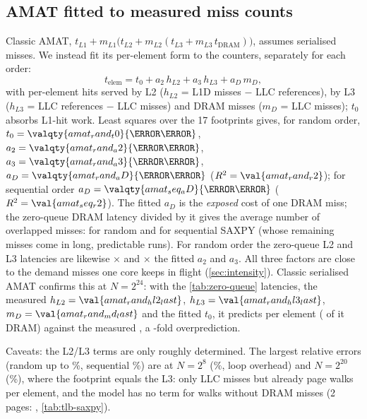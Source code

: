 \subsection{AMAT fitted to measured miss counts}
Classic AMAT, $t_{L1} + m_{L1}\bigl(t_{L2} + m_{L2}(t_{L3} + m_{L3}\,t_{\text{DRAM}})\bigr)$, assumes
serialised misses. We instead fit its per-element form to the counters, separately for each order:
\begin{equation}\label{eq:amat-fit}
  t_{\text{elem}} = t_0 + a_2\,h_{L2} + a_3\,h_{L3} + a_D\,m_D ,
\end{equation}
with per-element hits served by L2 ($h_{L2}$ = L1D misses $-$ LLC references), by L3 ($h_{L3}$ = LLC
references $-$ LLC misses) and DRAM misses ($m_D$ = LLC misses); $t_0$ absorbs L1-hit work. Least squares
over the 17 footprints gives, for random order,
$t_0=\valqty{amat_rand_t0}{\nano\second}$, $a_2=\valqty{amat_rand_a2}{\nano\second}$,
$a_3=\valqty{amat_rand_a3}{\nano\second}$, $a_D=\valqty{amat_rand_aD}{\nano\second}$ ($R^2=\val{amat_rand_r2}$);
for sequential order $a_D=\valqty{amat_seq_aD}{\nano\second}$ ($R^2=\val{amat_seq_r2}$). The fitted $a_D$ is
the \emph{exposed} cost of one DRAM miss; the zero-queue DRAM latency divided by it gives the average
number of overlapped misses:  for random and  for sequential SAXPY
(whose remaining misses come in long, predictable runs). For random order the zero-queue L2 and L3 latencies
are likewise $\times$ and $\times$ the fitted $a_2$ and $a_3$. All
three factors are close to the  demand misses one core keeps in flight
(\cref{sec:intensity}). Classic serialised AMAT confirms this at $N=2^{24}$: with the
\cref{tab:zero-queue} latencies, the measured
$h_{L2}=\val{amat_rand_hl2_last}$, $h_{L3}=\val{amat_rand_hl3_last}$, $m_D=\val{amat_rand_md_last}$ and the
fitted $t_0$, it predicts  per element
( of it DRAM) against the measured
, a -fold overprediction.

Caveats: the L2/L3 terms are only roughly determined. The largest relative errors (random up to
\%, sequential \%) are at $N=2^{8}$
(\%, loop overhead) and $N=2^{20}$ (\%), where the
footprint equals the L3: only  LLC misses but already 
page walks per element, and the model has no term for walks without DRAM misses
(\qty{2}{\mebi\byte} pages: , \cref{tab:tlb-saxpy}).
